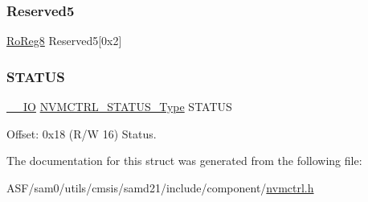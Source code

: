 \mbox{\label{struct_nvmctrl_a5771b852409b146285e223c4265972b8}} 
\subsubsection{\texorpdfstring{Reserved5}{Reserved5}}
{\footnotesize\ttfamily \mbox{\hyperlink{group___s_a_m_d21_e15_a__definitions_ga0d957f1433aaf5d70e4dc2b68288442d}{Ro\+Reg8}} Reserved5\mbox{[}0x2\mbox{]}}

\mbox{\label{struct_nvmctrl_afd27d22d985df8b03cd6d9b9ae688b66}} 
\subsubsection{\texorpdfstring{STATUS}{STATUS}}
{\footnotesize\ttfamily \mbox{\hyperlink{core__cm0plus_8h_aec43007d9998a0a0e01faede4133d6be}{\+\_\+\+\_\+\+IO}} \mbox{\hyperlink{union_n_v_m_c_t_r_l___s_t_a_t_u_s___type}{N\+V\+M\+C\+T\+R\+L\+\_\+\+S\+T\+A\+T\+U\+S\+\_\+\+Type}} S\+T\+A\+T\+US}



Offset\+: 0x18 (R/W 16) Status. 



The documentation for this struct was generated from the following file\+:\begin{DoxyCompactItemize}
\item 
A\+S\+F/sam0/utils/cmsis/samd21/include/component/\mbox{\hyperlink{component_2nvmctrl_8h}{nvmctrl.\+h}}\end{DoxyCompactItemize}
